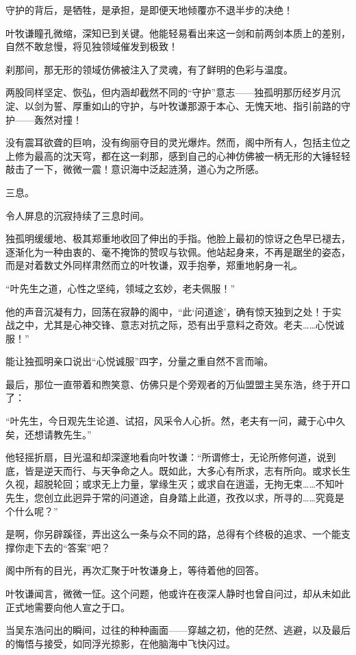 守护的背后，是牺牲，是承担，是即便天地倾覆亦不退半步的决绝！

叶牧谦瞳孔微缩，深知已到关键。他能轻易看出来这一剑和前两剑本质上的差别，自然不敢怠慢，将见独领域催发到极致！

刹那间，那无形的领域仿佛被注入了灵魂，有了鲜明的色彩与温度。

两股同样坚定、恢弘，但内涵却截然不同的“守护”意志——独孤明那历经岁月沉淀、以剑为誓、厚重如山的守护，与叶牧谦那源于本心、无愧天地、指引前路的守护——轰然对撞！

没有震耳欲聋的巨响，没有绚丽夺目的灵光爆炸。然而，阁中所有人，包括主位之上修为最高的沈天穹，都在这一刹那，感到自己的心神仿佛被一柄无形的大锤轻轻敲击了一下，微微一震！意识海中泛起涟漪，道心为之所感。

三息。

令人屏息的沉寂持续了三息时间。

独孤明缓缓地、极其郑重地收回了伸出的手指。他脸上最初的惊讶之色早已褪去，逐渐化为一种由衷的、毫不掩饰的赞叹与钦佩。他站起身来，不再是踞坐的姿态，而是对着数丈外同样肃然而立的叶牧谦，双手抱拳，郑重地躬身一礼。

“叶先生之道，心性之坚纯，领域之玄妙，老夫佩服！”

他的声音沉凝有力，回荡在寂静的阁中，“此‘问道途’，确有惊天独到之处！于实战之中，尤其是心神交锋、意志对抗之际，恐有出乎意料之奇效。老夫……心悦诚服！”

能让独孤明亲口说出“心悦诚服”四字，分量之重自然不言而喻。

\vspace{2em}

最后，那位一直带着和煦笑意、仿佛只是个旁观者的万仙盟盟主吴东浩，终于开口了：

“叶先生，今日观先生论道、试招，风采令人心折。然，老夫有一问，藏于心中久矣，还想请教先生。”

他轻摇折扇，目光温和却深邃地看向叶牧谦：“所谓修士，无论所修何道，说到底，皆是逆天而行、与天争命之人。既如此，大多心有所求，志有所向。或求长生久视，超脱轮回；或求无上力量，掌缘生灭；或求自在逍遥，无拘无束……不知叶先生，您创立此迥异于常的问道途，自身踏上此道，孜孜以求，所寻的……究竟是个什么呢？”

是啊，你另辟蹊径，弄出这么一条与众不同的路，总得有个终极的追求、一个能支撑你走下去的“答案”吧？

阁中所有的目光，再次汇聚于叶牧谦身上，等待着他的回答。

叶牧谦闻言，微微一怔。这个问题，他或许在夜深人静时也曾自问过，却从未如此正式地需要向他人宣之于口。

当吴东浩问出的瞬间，过往的种种画面——穿越之初，他的茫然、逃避，以及最后的悔悟与接受，如同浮光掠影，在他脑海中飞快闪过。


